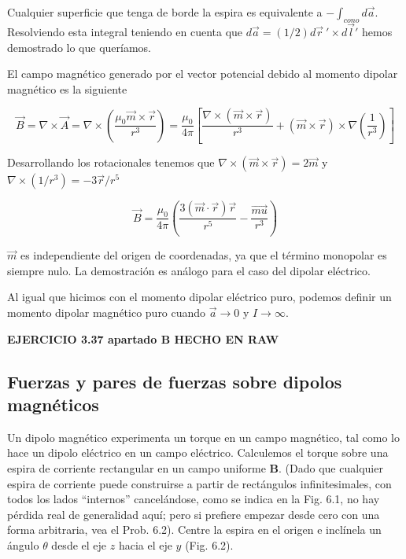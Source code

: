 \documentclass[12pt,a4paper]{report}
\newcommand{\esp}{\vspace{0.5cm}}
\begin{document}
	\esp
	
	Cualquier superficie que tenga de borde la espira es equivalente a $-\int_{cono}d\vec{a}$. Resolviendo esta integral teniendo en cuenta que $d\vec{a}= (1/2) d\vec{r}\ '\times d\vec{l}'$ hemos demostrado lo que queríamos.
	
	\esp

	\noindent El campo magnético generado por el vector potencial debido al momento dipolar magnético es la siguiente
	
	\esp
	
	\begin{equation}
		\vec{B} = \nabla \times \vec{A} = \nabla \times \left( \frac{\mu_0 \vec{m}\times \vec{r}}{r^3} \right) = \frac{\mu_0}{4\pi} \left[ \frac{\nabla \times (\vec{m}\times\vec{r})}{r^3} + (\vec{m}\times\vec{r})\times\nabla\left(\frac{1}{r^3}\right) \right]
	\end{equation}
		
	\esp
	
	\noindent Desarrollando los rotacionales tenemos que $\nabla\times(\vec{m}\times\vec{r}) = 2\vec{m}$ y $\nabla\times(1/r^3)=-3\vec{r}/r^5$
	
	\esp
	
	\begin{equation}
		\vec{B} = \frac{\mu_0}{4\pi}\left( \frac{3(\vec{m}\cdot \vec{r})\vec{r}}{r^5} - \frac{\vec{mu}}{r^3} \right)
	\end{equation}
	
	\esp
	
	\begin{importante}
		$\vec{m}$ es independiente del origen de coordenadas, ya que el término monopolar es siempre nulo. La demostración es análogo para el caso del dipolar eléctrico.
	\end{importante}
	
	\esp
	
	Al igual que hicimos con el momento dipolar eléctrico puro, podemos definir un momento dipolar magnético puro cuando $\vec{a}\rightarrow 0$ y $I\rightarrow \infty$.
	
	\esp
	
	\noindent \textbf{EJERCICIO 3.37 apartado B HECHO EN RAW}
	
	\subsection{Fuerzas y pares de fuerzas sobre dipolos magnéticos}
	
	Un dipolo magnético experimenta un torque en un campo magnético, tal como lo hace un dipolo eléctrico en un campo eléctrico. Calculemos el torque sobre una espira de corriente rectangular en un campo uniforme $\mathbf{B}$. (Dado que cualquier espira de corriente puede construirse a partir de rectángulos infinitesimales, con todos los lados ``internos'' cancelándose, como se indica en la Fig. 6.1, no hay pérdida real de generalidad aquí; pero si prefiere empezar desde cero con una forma arbitraria, vea el Prob. 6.2). Centre la espira en el origen e inclínela un ángulo $\theta$ desde el eje $z$ hacia el eje $y$ (Fig. 6.2). 
	
\end{document}

